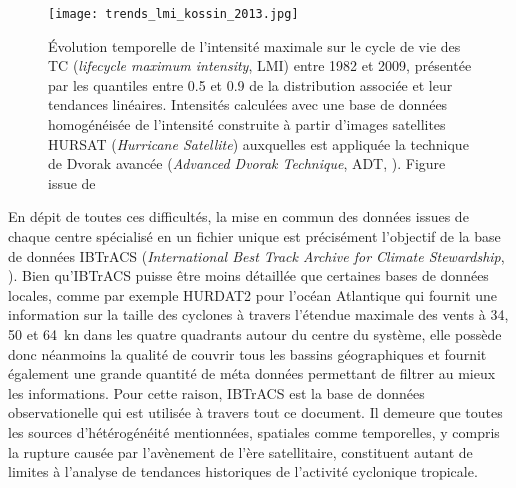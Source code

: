 \documentclass[../main.tex]{subfiles}
\begin{document}
\begin{figure}[tb]
    \centering
    \texttt{[image: trends\_lmi\_kossin\_2013.jpg]}
    \caption{Évolution temporelle de l'intensité maximale sur le cycle de vie des TC (\textit{lifecycle maximum intensity}, LMI) entre 1982 et 2009, présentée
        par les quantiles entre \num{0.5} et \num{0.9} de la distribution associée et leur tendances linéaires. Intensités calculées avec une base de données
        homogénéisée de l'intensité construite à partir d'images satellites \hbox{HURSAT} (\textit{Hurricane Satellite}) auxquelles est appliquée la technique
        de Dvorak avancée (\textit{Advanced Dvorak Technique}, ADT, \cite{olander_advanced_2007}). Figure issue de \hbox{\textcite{kossin_trend_2013}}}
    \label{fig:observed_trends_lmi}
\end{figure}

En dépit de toutes ces difficultés, la mise en commun des données issues de chaque centre spécialisé en un fichier unique est précisément l'objectif de la base
de données IBTrACS (\textit{International Best Track Archive for Climate Stewardship}, \textcite{knapp_international_2010}). Bien qu'IBTrACS puisse être moins
détaillée que certaines bases de données locales, comme par exemple HURDAT2 pour l'océan Atlantique \parencite{landsea_atlantic_2013} qui fournit une
information sur la taille des cyclones à travers l'étendue maximale des vents à \num{34}, \num{50} et \SI{64}{\knot} dans les quatre quadrants autour du centre
du système, elle possède donc néanmoins la qualité de couvrir tous les bassins géographiques et fournit également une grande quantité de méta données permettant
de filtrer au mieux les informations. Pour cette raison, IBTrACS est la base de données observationelle qui est utilisée à travers tout ce document. Il demeure
que toutes les sources d'hétérogénéité mentionnées, spatiales comme temporelles, y compris la rupture causée par l'avènement de l'ère satellitaire, constituent
autant de limites à l'analyse de tendances historiques de l'activité cyclonique tropicale.
\end{document}

